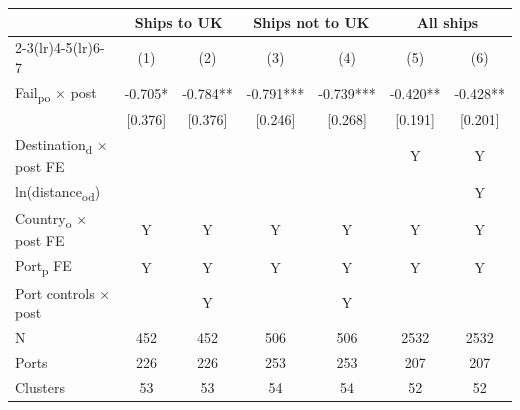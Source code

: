 {
\def\sym#1{\ifmmode^{#1}\else\(^{#1}\)\fi}
\begin{tabular}{l*{6}{c}}
\toprule
            &\multicolumn{2}{c}{Ships to UK}&\multicolumn{2}{c}{Ships not to UK}&\multicolumn{2}{c}{All ships}  \\\cmidrule(lr){2-3}\cmidrule(lr){4-5}\cmidrule(lr){6-7}
            &\multicolumn{1}{c}{(1)}   &\multicolumn{1}{c}{(2)}   &\multicolumn{1}{c}{(3)}   &\multicolumn{1}{c}{(4)}   &\multicolumn{1}{c}{(5)}   &\multicolumn{1}{c}{(6)}   \\
\midrule
Fail\textsubscript{po} $\times$ post&      -0.705*  &      -0.784** &      -0.791***&      -0.739***&      -0.420** &      -0.428** \\
            &     [0.376]   &     [0.376]   &     [0.246]   &     [0.268]   &     [0.191]   &     [0.201]   \\
Destination\textsubscript{d} $\times$ post FE&               &               &               &               &           Y   &           Y   \\
ln(distance\textsubscript{od}) &               &               &               &               &               &           Y   \\
Country\textsubscript{o} $\times$ post FE&           Y   &           Y   &           Y   &           Y   &           Y   &           Y   \\
Port\textsubscript{p} FE &           Y   &           Y   &           Y   &           Y   &           Y   &           Y   \\
Port controls $\times$ post&               &           Y   &               &           Y   &               &               \\
\midrule
N           &         452   &         452   &         506   &         506   &        2532   &        2532   \\
Ports       &         226   &         226   &         253   &         253   &         207   &         207   \\
Clusters    &          53   &          53   &          54   &          54   &          52   &          52   \\
\bottomrule
\end{tabular}
}
